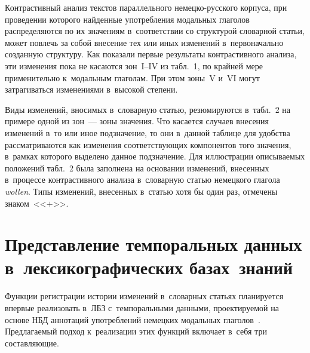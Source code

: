 \begin{multicols}{2}
    Контрастивный анализ текстов параллельного немецко-русского 
корпуса, при проведении которого найденные употребления модальных 
глаголов распределяются по их значениям в~соответствии со структурой 
словарной статьи, может повлечь за собой внесение тех или иных изменений в~первоначально созданную структуру. Как показали первые результаты 
контрастивного анализа, эти изменения пока не касаются зон~I--IV из 
табл.~1, по крайней мере применительно к~модальным глаголам. При этом 
зоны~V и~VI могут затрагиваться изменениями в~высокой степени. 
    
    Виды изменений, вносимых в~словарную статью, резюмируются 
в~табл.~2 на примере одной из зон~--- зоны значения. 
Что касается случаев внесения изменений в~то или иное 
подзначение, то они в~данной таблице для удобства рассматриваются как 
изменения соответствующих компонентов того значения, в~рамках которого 
выделено данное подзначение. Для иллюстрации описываемых положений 
табл.~2 была заполнена на основании изменений, внесенных в~процессе 
контрастивного анализа в~словарную статью немецкого глагола 
\textit{wollen}. Типы изменений, внесенных в~статью хотя бы один раз, 
отмечены знаком~<<$+$>>.


\vspace*{-3pt}

\section{Представление темпоральных данных
в~лексикографических базах~знаний}

\vspace*{-2pt}

    Функции регистрации истории изменений в~словарных статьях 
планируется впервые реализовать в~ЛБЗ с~темпоральными данными, 
проектируемой на основе НБД аннотаций употреблений немецких модальных 
глаголов~\cite{3-gon}. Предлагаемый подход к~реализации этих функций 
включает в~себя три составляющие.
    

\end{multicols}
